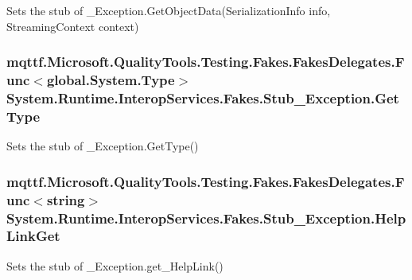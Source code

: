 Sets the stub of \-\_\-\-Exception.\-Get\-Object\-Data(\-Serialization\-Info info, Streaming\-Context context)

\hypertarget{class_system_1_1_runtime_1_1_interop_services_1_1_fakes_1_1_stub___exception_a14d51a5a437dd2fb9c6ccf610c22bb45}{
\subsubsection[{Get\-Type}]{\setlength{\rightskip}{0pt plus 5cm}mqttf.\-Microsoft.\-Quality\-Tools.\-Testing.\-Fakes.\-Fakes\-Delegates.\-Func$<$global.\-System.\-Type$>$ System.\-Runtime.\-Interop\-Services.\-Fakes.\-Stub\-\_\-\-Exception.\-Get\-Type}}\label{class_system_1_1_runtime_1_1_interop_services_1_1_fakes_1_1_stub___exception_a14d51a5a437dd2fb9c6ccf610c22bb45}


Sets the stub of \-\_\-\-Exception.\-Get\-Type()

\hypertarget{class_system_1_1_runtime_1_1_interop_services_1_1_fakes_1_1_stub___exception_a04681476f269d0743d4aba6b3a8a788c}{
\subsubsection[{Help\-Link\-Get}]{\setlength{\rightskip}{0pt plus 5cm}mqttf.\-Microsoft.\-Quality\-Tools.\-Testing.\-Fakes.\-Fakes\-Delegates.\-Func$<$string$>$ System.\-Runtime.\-Interop\-Services.\-Fakes.\-Stub\-\_\-\-Exception.\-Help\-Link\-Get}}\label{class_system_1_1_runtime_1_1_interop_services_1_1_fakes_1_1_stub___exception_a04681476f269d0743d4aba6b3a8a788c}


Sets the stub of \-\_\-\-Exception.\-get\-\_\-\-Help\-Link()

